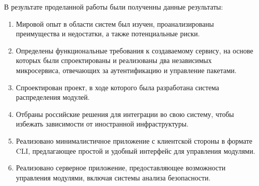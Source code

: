 \Conclusion %

В результате проделанной работы были полученны данные результаты:

\begin{enumerate}
    \item Мировой опыт в области систем был изучен, проанализированы преимущества и недостатки, а также потенциальные риски.
    \item Определены функциональные требования к создаваемому сервису, на основе которых были спроектированы и реализованы два независимых микросервиса, отвечающих за аутентификацию и управление пакетами.
    \item Спроектирован проект, в ходе которого была разработана система распределения модулей.
    \item Отбраны российские решения для интеграции во свою систему, чтобы избежать зависимости от иностранной инфраструктуры.
    \item Реализовано минималистичное приложение с клиентской стороны в формате CLI, предлагающее простой и удобный интерфейс для управления модулями.
    \item Реализовано серверное приложение, предоставляющее возможности управления модулями, включая системы анализа безопасности.
\end{enumerate}

